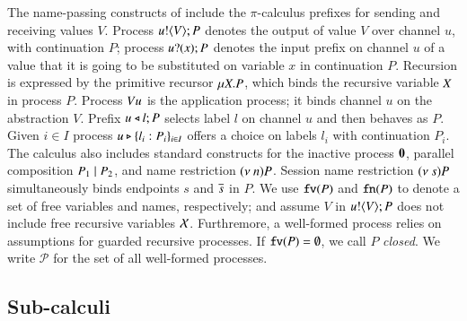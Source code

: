 The name-passing constructs of \HOp include the
$\pi$-calculus prefixes for sending and receiving values $V$.
Process $u ! \langle V \rangle ; P$ denotes the output of value $V$
over channel $u$, with continuation $P$;
process $u ? (x) ; P$ denotes the input prefix on channel $u$ of a value
that it is going to be substituted on variable $x$ in continuation $P$. 
Recursion is expressed by the primitive recursor $\mu X. P$,
which binds the recursive variable $X$ in process $P$.
Process $Vu$ is the application
process; it binds channel $u$ on the abstraction $V$.
Prefix $u \triangleleft l ; P$ selects label $l$ on channel $u$
and then behaves as $P$.
Given $i \in I$ process $u \triangleright \{l_i: P_i\}_{i \in I}$ offers a choice
on labels $l_i$ with continuation $P_i$.
The calculus also includes standard constructs for 
the inactive process $\mathbf{0}$, 
parallel composition $P_1 \;|\; P_2$, and 
name restriction $(\nu\ n) P$.
Session name restriction $(\nu\ s) P$ simultaneously 
binds endpoints $s$ and $\overline{s}$ in $P$.
We use $\mathtt{fv}(P)$ and $\mathtt{fn}(P)$ to denote a set of free 
variables and names, respectively; 
and assume $V$ in $u ! \langle V \rangle ;{P}$ does not include free recursive 
variables $\mathcal{X}$. 
Furthremore, a well-formed process relies on assumptions for
guarded recursive processes.
If $\mathtt{fv}(P) = \emptyset$, we call $P$ {\em closed}.
We write $\mathcal{P}$ for the set of all well-formed
processes.




\subsection{Sub-calculi}

\label{subsec:subcalculi}

